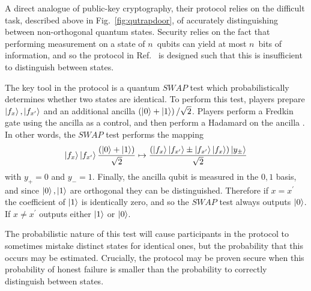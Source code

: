 
A direct analogue of public-key cryptography, their protocol relies on the difficult task, described above in Fig.~\ref{fig:qutrapdoor}, of accurately distinguishing between non-orthogonal quantum states. Security relies on the fact that performing measurement on a state of $n$~qubits can yield at most $n$~bits of information, and so the protocol in Ref.~\cite{Gottesman2001} is designed such that this is insufficient to distinguish between states.

The key tool in the protocol is a quantum $SWAP$ test which probabilistically determines whether two states are identical. To perform this test, players prepare $\ket{f_x}, \ket{f_{x^\prime}}$ and an additional ancilla $\left(\ket{0} + \ket{1}\right)/\sqrt{2}$. Players perform a Fredkin gate using the ancilla as a control, and then perform a Hadamard on the ancilla \cite{Nielsen2010, brendon_book}. In other words, the $SWAP$ test performs the mapping %
\begin{equation}
\ket{f_x}\ket{f_{x^\prime}}\frac{\left(\ket{0} + \ket{1}\right)}{\sqrt{2}} \mapsto \frac{\left(\ket{f_x}\ket{f_{x^\prime}} \pm \ket{f_{x^\prime}}\ket{f_x}\right)\ket{y_{\pm}}}{\sqrt{2}}
\end{equation}
with $y_+=0$ and $y_-=1$. Finally, the ancilla qubit is measured in the $0, 1$ basis, and since $\ket{0}, \ket{1}$ are orthogonal they can be distinguished.  Therefore if $x = x^\prime$ the coefficient of $\ket{1}$ is identically zero, and so the $SWAP$ test always outputs $\ket{0}$. If $x \ne x^\prime$ outputs either $\ket{1}$ or $\ket{0}$. 

The probabilistic nature of this test will cause participants in the protocol to sometimes mistake distinct states for identical ones, but the probability that this occurs may be estimated. Crucially, the protocol may be proven secure when this probability of honest failure is smaller than the probability to correctly distinguish between states.



